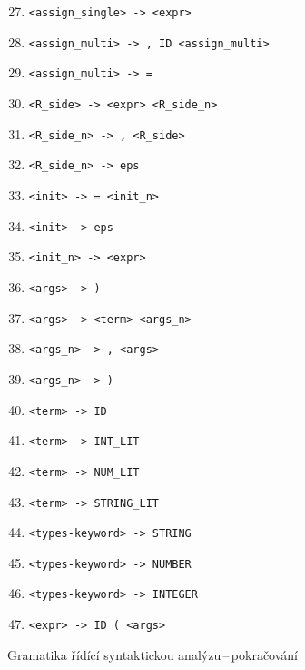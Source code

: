 \documentclass[11pt]{article}
\begin{document}
\begin{table}[H]
    \centering
    \begin{enumerate}
        \setcounter{enumi}{26}
        \item \verb|<assign_single> -> <expr>|

        \item \verb|<assign_multi> -> , ID <assign_multi>|
        \item \verb|<assign_multi> -> =|

        \item \verb|<R_side> -> <expr> <R_side_n>|
        \item \verb|<R_side_n> -> , <R_side>|
        \item \verb|<R_side_n> -> eps|

        \item \verb|<init> -> = <init_n>|
        \item \verb|<init> -> eps|
        \item \verb|<init_n> -> <expr>|

        \item \verb|<args> -> )|
        \item \verb|<args> -> <term> <args_n>|
        \item \verb|<args_n> -> , <args>|
        \item \verb|<args_n> -> )|

        \item \verb|<term> -> ID|
        \item \verb|<term> -> INT_LIT|
        \item \verb|<term> -> NUM_LIT|
        \item \verb|<term> -> STRING_LIT|

        \item \verb|<types-keyword> -> STRING|
        \item \verb|<types-keyword> -> NUMBER|
        \item \verb|<types-keyword> -> INTEGER|

        \item \verb|<expr> -> ID ( <args>|

    \end{enumerate}
    \caption{Gramatika řídící syntaktickou analýzu\,--\,pokračování}
    \label{tab:ll-gramatika-pokracovani}
\end{table}
\end{document}
